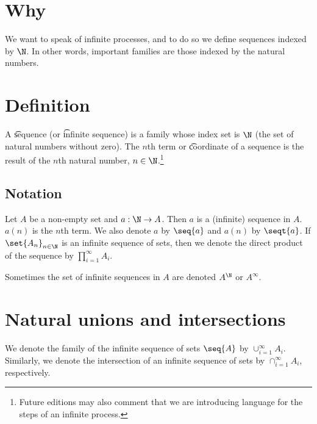 
\section*{Why}

We want to speak of infinite processes, and to do so we define sequences indexed by $\N  $.
In other words, important families are those indexed by the natural numbers.

\section*{Definition}

A \t{sequence} (or \t{infinite sequence}) is a family whose index set is $\N  $ (the set of natural numbers without zero).
The \t{$n$th term} or \t{coordinate} of a sequence is the result of the $n$th natural number, $n \in \N  $.\footnote{Future editions may also comment that we are introducing language for the steps of an infinite process.}

\subsection*{Notation}

Let $A$ be a non-empty set and $a: \N   \to A$.
Then $a$ is a (infinite) sequence in $A$.
$a(n)$ is the $n$th term.
We also denote $a$ by $\seq{a}$ and $a(n)$ by $\seqt{a}$.
If $\set{A_n}_{n \in \N  }$ is an infinite sequence of sets, then we denote the direct product of the sequence by $\prod_{i = 1}^{\infty} A_i$.

Sometimes the set of infinite sequences in $A$ are denoted $A^\N  $ or $A^\infty$.

\section*{Natural unions and intersections}

We denote the family of the infinite sequence of sets $\seq{A}$ by $\cup_{i = 1}^{\infty} A_i$.
Similarly, we denote the intersection of an infinite sequence of sets by $\cap _{i = 1}^{\infty} A_i$, respectively.

\blankpage